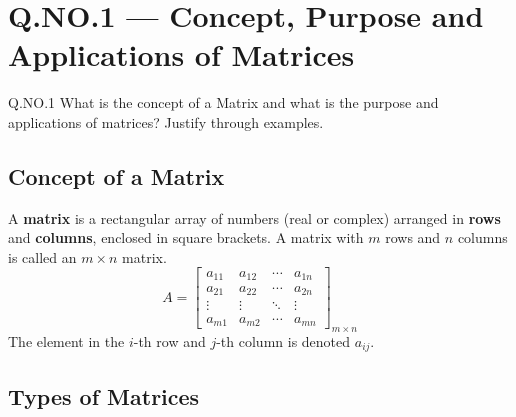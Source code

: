 \documentclass[12pt]{article}
\begin{document}
\vspace{16pt}

\begin{tcolorbox}[enhanced, arc=4pt, boxrule=1.5pt,
  colback=white, colframe=primary, left=10pt, right=10pt, top=4pt, bottom=8pt,
  title={\bfseries\color{white} Table of Contents}, colbacktitle=primary,
  attach boxed title to top left={xshift=10pt, yshift=-\tcboxedtitleheight/2},
  boxed title style={arc=3pt, colframe=primary, boxrule=0pt}]
\vspace{4pt}\tableofcontents
\end{tcolorbox}

\newpage

\section{Q.NO.1 — Concept, Purpose and Applications of Matrices}

\begin{qbox}{Q.NO.1}
What is the concept of a Matrix and what is the purpose and applications of matrices? Justify through examples.
\end{qbox}

\subsection{Concept of a Matrix}

\begin{defbox}[Matrix]
A \textbf{matrix} is a rectangular array of numbers (real or complex) arranged in \textbf{rows} and \textbf{columns}, enclosed in square brackets. A matrix with $m$ rows and $n$ columns is called an $m \times n$ matrix.
\[
  A = \begin{bmatrix} a_{11} & a_{12} & \cdots & a_{1n} \\ a_{21} & a_{22} & \cdots & a_{2n} \\ \vdots & \vdots & \ddots & \vdots \\ a_{m1} & a_{m2} & \cdots & a_{mn} \end{bmatrix}_{m\times n}
\]
The element in the $i$-th row and $j$-th column is denoted $a_{ij}$.
\end{defbox}

\subsection{Types of Matrices}
\end{document}
